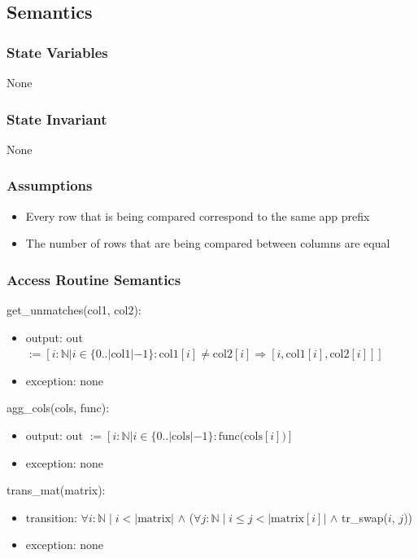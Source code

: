 \documentclass[12pt]{article}
\begin{document}
\subsection* {Semantics}

\subsubsection* {State Variables}

None

\subsubsection* {State Invariant}

None

\subsubsection* {Assumptions}

\begin{itemize}
  \item Every row that is being compared correspond to the same app prefix
  \item The number of rows that are being compared between columns are equal
\end{itemize}

\subsubsection* {Access Routine Semantics}

\noindent get\_unmatches(col1, col2):
\begin{itemize}
    \item output: out $:= [ i: \mathbb{N} | i \in \{0 .. |\text{col}1|-1\} : \text{col}1[i] \neq \text{col}2[i] \Rightarrow [ i,  \text{col}1[i], \text{col}2[i]] ]$
    \item exception: none
\end{itemize}

\noindent agg\_cols(cols, func):
\begin{itemize}
    \item output: out $:= [ i: \mathbb{N} | i \in \{0 .. |\text{cols}|-1\} : \text{func(cols}[i]\text{)} ]$
    \item exception: none
\end{itemize}

\noindent trans\_mat(matrix):
\begin{itemize}
    \item transition: $\forall i : \mathbb{N} \; | \; i < |\text{matrix}| $ $\wedge$ 
    ($\forall j : \mathbb{N} \; | \; i \le j < |\text{matrix}[i]|$ $\wedge$ tr\_swap($i$, $j$))
    \item exception: none
\end{itemize}
\end{document}
